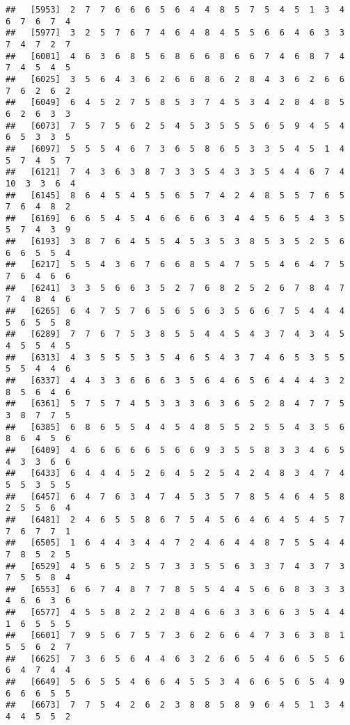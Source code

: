 \documentclass[
]{book}
\begin{document}
\begin{verbatim}
##   [5953]  2  7  7  6  6  6  5  6  4  4  8  5  7  5  4  5  1  3  4  6  7  6  7  4
##   [5977]  3  2  5  7  6  7  4  6  4  8  4  5  5  6  6  4  6  3  3  7  4  7  2  7
##   [6001]  4  6  3  6  8  5  6  8  6  6  8  6  6  7  4  6  8  7  4  7  4  5  4  5
##   [6025]  3  5  6  4  3  6  2  6  6  8  6  2  8  4  3  6  2  6  6  7  6  2  6  2
##   [6049]  6  4  5  2  7  5  8  5  3  7  4  5  3  4  2  8  4  8  5  6  2  6  3  3
##   [6073]  7  5  7  5  6  2  5  4  5  3  5  5  5  6  5  9  4  5  4  6  5  3  3  5
##   [6097]  5  5  5  4  6  7  3  6  5  8  6  5  3  3  5  4  5  1  4  5  7  4  5  7
##   [6121]  7  4  3  6  3  8  7  3  3  5  4  3  3  5  4  4  6  7  4 10  3  3  6  4
##   [6145]  8  6  4  5  4  5  5  6  5  7  4  2  4  8  5  5  7  6  5  7  6  4  8  2
##   [6169]  6  6  5  4  5  4  6  6  6  6  3  4  4  5  6  5  4  3  5  5  7  4  3  9
##   [6193]  3  8  7  6  4  5  5  4  5  3  5  3  8  5  3  5  2  5  6  6  6  5  5  4
##   [6217]  5  5  4  3  6  7  6  6  8  5  4  7  5  5  4  6  4  7  5  7  6  4  6  6
##   [6241]  3  3  5  6  6  3  5  2  7  6  8  2  5  2  6  7  8  4  7  7  4  8  4  6
##   [6265]  6  4  7  5  7  6  5  6  5  6  3  5  6  6  7  5  4  4  4  5  6  5  5  8
##   [6289]  7  7  6  7  5  3  8  5  5  4  4  5  4  3  7  4  3  4  5  4  5  5  4  5
##   [6313]  4  3  5  5  5  3  5  4  6  5  4  3  7  4  6  5  3  5  5  5  5  4  4  6
##   [6337]  4  4  3  3  6  6  6  3  5  6  4  6  5  6  4  4  4  3  2  8  5  6  4  6
##   [6361]  5  7  5  7  4  5  3  3  3  6  3  6  5  2  8  4  7  7  5  3  8  7  7  5
##   [6385]  6  8  6  5  5  4  4  5  4  8  5  5  2  5  5  4  3  5  6  8  6  4  5  6
##   [6409]  4  6  6  6  6  6  5  6  6  9  3  5  5  8  3  3  4  6  5  4  3  3  6  6
##   [6433]  6  4  4  4  5  2  6  4  5  2  5  4  2  4  8  3  4  7  4  5  5  3  5  5
##   [6457]  6  4  7  6  3  4  7  4  5  3  5  7  8  5  4  6  4  5  8  2  5  5  6  4
##   [6481]  2  4  6  5  5  8  6  7  5  4  5  6  4  6  4  5  4  5  7  7  6  7  7  1
##   [6505]  1  6  4  4  3  4  4  7  2  4  6  4  4  8  7  5  5  4  4  7  8  5  2  5
##   [6529]  4  5  6  5  2  5  7  3  3  5  5  6  3  3  7  4  3  7  3  7  5  5  8  4
##   [6553]  6  6  7  4  8  7  7  8  5  5  4  4  5  6  6  8  3  3  3  4  6  6  3  6
##   [6577]  4  5  5  8  2  2  2  8  4  6  6  3  3  6  6  3  5  4  4  1  6  5  5  5
##   [6601]  7  9  5  6  7  5  7  3  6  2  6  6  4  7  3  6  3  8  1  5  5  6  2  7
##   [6625]  7  3  6  5  6  4  4  6  3  2  6  6  5  4  6  6  5  5  6  6  4  7  4  4
##   [6649]  5  6  5  5  4  6  6  4  5  5  3  4  6  6  5  6  5  4  9  6  6  6  5  5
##   [6673]  7  7  5  4  2  6  2  3  8  8  5  8  9  6  4  5  1  3  4  4  4  5  5  2

\end{verbatim}
\end{document}
